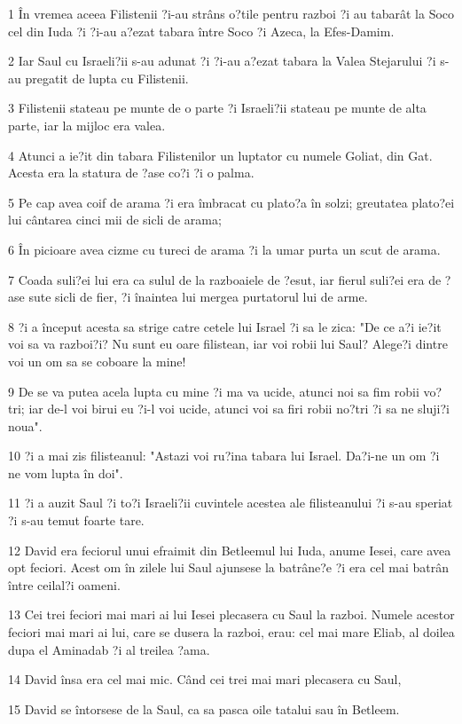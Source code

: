 \par 1 În vremea aceea Filistenii ?i-au strâns o?tile pentru razboi ?i au tabarât la Soco cel din Iuda ?i ?i-au a?ezat tabara între Soco ?i Azeca, la Efes-Damim.
\par 2 Iar Saul cu Israeli?ii s-au adunat ?i ?i-au a?ezat tabara la Valea Stejarului ?i s-au pregatit de lupta cu Filistenii.
\par 3 Filistenii stateau pe munte de o parte ?i Israeli?ii stateau pe munte de alta parte, iar la mijloc era valea.
\par 4 Atunci a ie?it din tabara Filistenilor un luptator cu numele Goliat, din Gat. Acesta era la statura de ?ase co?i ?i o palma.
\par 5 Pe cap avea coif de arama ?i era îmbracat cu plato?a în solzi; greutatea plato?ei lui cântarea cinci mii de sicli de arama;
\par 6 În picioare avea cizme cu tureci de arama ?i la umar purta un scut de arama.
\par 7 Coada suli?ei lui era ca sulul de la razboaiele de ?esut, iar fierul suli?ei era de ?ase sute sicli de fier, ?i înaintea lui mergea purtatorul lui de arme.
\par 8 ?i a început acesta sa strige catre cetele lui Israel ?i sa le zica: "De ce a?i ie?it voi sa va razboi?i? Nu sunt eu oare filistean, iar voi robii lui Saul? Alege?i dintre voi un om sa se coboare la mine!
\par 9 De se va putea acela lupta cu mine ?i ma va ucide, atunci noi sa fim robii vo?tri; iar de-l voi birui eu ?i-l voi ucide, atunci voi sa firi robii no?tri ?i sa ne sluji?i noua".
\par 10 ?i a mai zis filisteanul: "Astazi voi ru?ina tabara lui Israel. Da?i-ne un om ?i ne vom lupta în doi".
\par 11 ?i a auzit Saul ?i to?i Israeli?ii cuvintele acestea ale filisteanului ?i s-au speriat ?i s-au temut foarte tare.
\par 12 David era feciorul unui efraimit din Betleemul lui Iuda, anume Iesei, care avea opt feciori. Acest om în zilele lui Saul ajunsese la batrâne?e ?i era cel mai batrân între ceilal?i oameni.
\par 13 Cei trei feciori mai mari ai lui Iesei plecasera cu Saul la razboi. Numele acestor feciori mai mari ai lui, care se dusera la razboi, erau: cel mai mare Eliab, al doilea dupa el Aminadab ?i al treilea ?ama.
\par 14 David însa era cel mai mic. Când cei trei mai mari plecasera cu Saul,
\par 15 David se întorsese de la Saul, ca sa pasca oile tatalui sau în Betleem.
